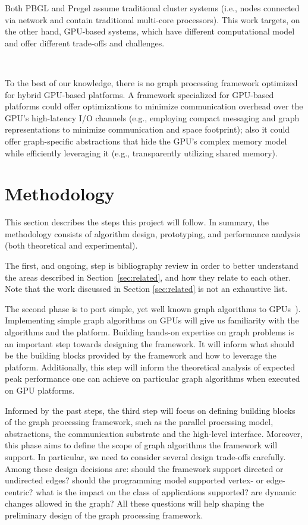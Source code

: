 \documentclass{acm_proc_article-sp}[12pt]
\begin{document}
Both PBGL and Pregel assume traditional cluster systems (i.e., nodes connected via network and contain traditional multi-core processors). This work targets, on the other hand, GPU-based systems, which have different computational model and offer different trade-offs and challenges.

\\

To the best of our knowledge, there is no graph processing framework optimized for hybrid GPU-based platforms. A framework specialized for GPU-based platforms could offer optimizations to minimize communication overhead over the GPU's high-latency I/O channels (e.g., employing compact messaging and graph representations to minimize communication and space footprint); also it could offer graph-specific abstractions that hide the GPU's complex memory model while efficiently leveraging it (e.g., transparently utilizing shared memory). 

\section{Methodology}
\label{sec:methodology}
This section describes the steps this project will follow. In summary, the methodology consists of algorithm design, prototyping, and performance analysis (both theoretical and experimental).

The first, and ongoing, step is bibliography review in order to better understand the areas described in Section~\ref{sec:related}, and how they relate to each other. Note that the work discussed in Section \ref{sec:related} is not an exhaustive list. 

The second phase is to port simple, yet well known graph algorithms to GPUs~\cite{Meyer2003,Harish2007,Malewicz2009,Sungpack2010}). Implementing simple graph algorithms on GPUs will give us familiarity with the algorithms and the platform. Building hands-on expertise on graph problems is an important step towards designing the framework. It will inform what should be the building blocks provided by the framework and how to leverage the platform. Additionally, this step will inform the theoretical analysis of expected peak performance one can achieve on particular graph algorithms when executed on GPU platforms.

Informed by the past steps, the third step will focus on defining building blocks of the graph processing framework, such as the parallel processing model, abstractions, the communication substrate and the high-level interface. Moreover, this phase aims to define the scope of graph algorithms the framework will support. In particular, we need to consider several design trade-offs carefully. Among these design decisions are: should the framework support directed or undirected edges? should the programming model supported vertex- or edge-centric? what is the impact on the class of applications supported? are dynamic changes allowed in the graph? All these questions will help shaping the preliminary design of the graph processing framework.
\end{document}
